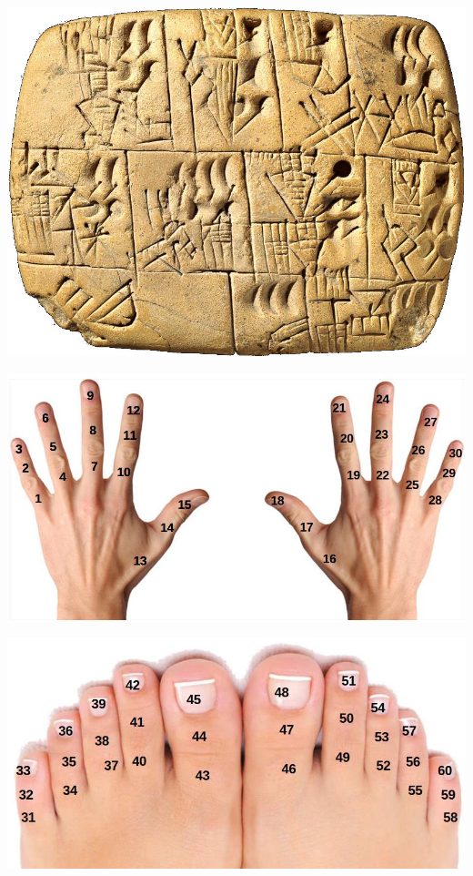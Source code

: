 \vfill
\pagebreak


\begin{multicols}{2}
	
	
	\begin{center}
		\includegraphics[width=\linewidth]{./IMG/argila.jpeg}
	\end{center}
	
	\vfill
	\columnbreak
	
	\begin{center}
	\includegraphics[height=.5\textheight]{./IMG/MAO-60.jpg}
	
	\includegraphics[height=.45\textheight]{./IMG/PES-60.jpg}
\end{center}
\end{multicols}

